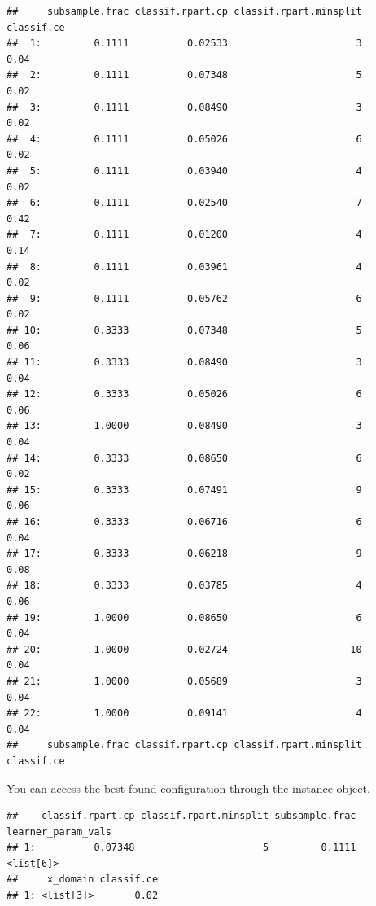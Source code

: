 \documentclass[
]{scrbook}
\newenvironment{Shaded}{\begin{snugshade}}{\end{snugshade}}
\newcommand{\NormalTok}[1]{#1}
\newcommand{\SpecialCharTok}[1]{\textcolor[rgb]{0.00,0.00,0.00}{#1}}
\renewenvironment{Shaded} {\begin{snugshade}\small} {\end{snugshade}}
\begin{document}
\begin{verbatim}
##     subsample.frac classif.rpart.cp classif.rpart.minsplit classif.ce
##  1:         0.1111          0.02533                      3       0.04
##  2:         0.1111          0.07348                      5       0.02
##  3:         0.1111          0.08490                      3       0.02
##  4:         0.1111          0.05026                      6       0.02
##  5:         0.1111          0.03940                      4       0.02
##  6:         0.1111          0.02540                      7       0.42
##  7:         0.1111          0.01200                      4       0.14
##  8:         0.1111          0.03961                      4       0.02
##  9:         0.1111          0.05762                      6       0.02
## 10:         0.3333          0.07348                      5       0.06
## 11:         0.3333          0.08490                      3       0.04
## 12:         0.3333          0.05026                      6       0.06
## 13:         1.0000          0.08490                      3       0.04
## 14:         0.3333          0.08650                      6       0.02
## 15:         0.3333          0.07491                      9       0.06
## 16:         0.3333          0.06716                      6       0.04
## 17:         0.3333          0.06218                      9       0.08
## 18:         0.3333          0.03785                      4       0.06
## 19:         1.0000          0.08650                      6       0.04
## 20:         1.0000          0.02724                     10       0.04
## 21:         1.0000          0.05689                      3       0.04
## 22:         1.0000          0.09141                      4       0.04
##     subsample.frac classif.rpart.cp classif.rpart.minsplit classif.ce
\end{verbatim}

You can access the best found configuration through the instance object.

\begin{Shaded}
\end{Shaded}

\begin{verbatim}
##    classif.rpart.cp classif.rpart.minsplit subsample.frac learner_param_vals
## 1:          0.07348                      5         0.1111          <list[6]>
##     x_domain classif.ce
## 1: <list[3]>       0.02
\end{verbatim}
\end{document}
